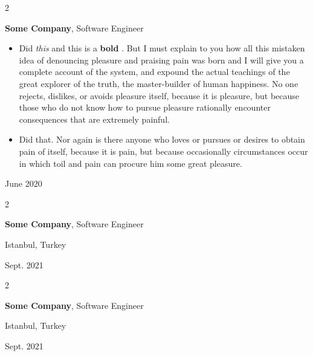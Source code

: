 \documentclass[10pt, letterpaper]{article}
\newenvironment{highlights}{
    \begin{itemize}[
        topsep=0.10 cm,
        parsep=0.10 cm,
        partopsep=0pt,
        itemsep=0pt,
        leftmargin=0.4 cm + 10pt
    ]
}{
    \end{itemize}
} %
\newenvironment{twocolentry}[2][]{
    \onecolentry
    \def\secondColumn{#2}
    \setcolumnwidth{\fill, 4.5 cm}
    \begin{paracol}{2}
}{
    \switchcolumn \raggedleft \secondColumn
    \end{paracol}
    \endonecolentry
} %
\let\hrefWithoutArrow\href
\renewcommand{\href}[2]{\hrefWithoutArrow{#1}{\mbox{\ifthenelse{\equal{#2}{}}{ }{#2 }\raisebox{.15ex}{\footnotesize \faExternalLink*}}}}
\begin{document}
        \vspace{0.2 cm}

        \begin{twocolentry}{
            June 2020
        }
            \textbf{Some \textnormal{Company}}, Software Engineer
            \begin{highlights}
                \item Did \textit{this} and this is a \textbf{bold} \href{https://example.com}{link}. But I must explain to you how all this mistaken idea of denouncing pleasure and praising pain was born and I will give you a complete account of the system, and expound the actual teachings of the great explorer of the truth, the master-builder of human happiness. No one rejects, dislikes, or avoids pleasure itself, because it is pleasure, but because those who do not know how to pursue pleasure rationally encounter consequences that are extremely painful.
                \item Did that. Nor again is there anyone who loves or pursues or desires to obtain pain of itself, because it is pain, but because occasionally circumstances occur in which toil and pain can procure him some great pleasure.
            \end{highlights}
        \end{twocolentry}


        \vspace{0.2 cm}

        \begin{twocolentry}{
            Istanbul, Turkey

        Sept. 2021
        }
            \textbf{Some \textnormal{Company}}, Software Engineer
        \end{twocolentry}


        \vspace{0.2 cm}

        \begin{twocolentry}{
            Istanbul, Turkey

        Sept. 2021
        }
            \textbf{Some \textnormal{Company}}, Software Engineer
        \end{twocolentry}


        \vspace{0.2 cm}
\end{document}

